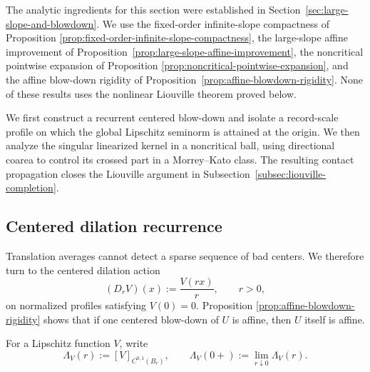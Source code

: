 \documentclass[11pt,reqno]{amsart}
\numberwithin{equation}{section}
\theoremstyle{remark}
\begin{document}
The analytic ingredients for this section were established in
Section~\ref{sec:large-slope-and-blowdown}.  We use the fixed-order
infinite-slope compactness of Proposition
\ref{prop:fixed-order-infinite-slope-compactness}, the large-slope affine
improvement of Proposition~\ref{prop:large-slope-affine-improvement}, the
noncritical pointwise expansion of Proposition
\ref{prop:noncritical-pointwise-expansion}, and the affine blow-down
rigidity of Proposition~\ref{prop:affine-blowdown-rigidity}.  None of
these results uses the nonlinear Liouville theorem proved below.

We first construct a recurrent centered blow-down and isolate a
record-scale profile on which the global Lipschitz seminorm is attained
at the origin.  We then analyze the singular linearized kernel in a
noncritical ball, using directional coarea to control its crossed part
in a Morrey--Kato class.  The resulting contact propagation closes the
Liouville argument in Subsection~\ref{subsec:liouville-completion}.

\subsection{Centered dilation recurrence}
\label{subsec:centered-dilation-recurrence}

Translation averages cannot detect a sparse sequence of bad centers.  We
therefore turn to the centered dilation action
\[
 (D_rV)(x):=\frac{V(rx)}r,
 \qquad r>0,
\]
on normalized profiles satisfying $V(0)=0$.  Proposition
\ref{prop:affine-blowdown-rigidity} shows that if one centered blow-down
of \(U\) is affine, then \(U\) itself is affine.

For a Lipschitz function $V$, write
\[
 \Lambda_V(r):=[V]_{C^{0,1}(B_r)},
 \qquad
 \Lambda_V(0+):=\lim_{r\downarrow0}\Lambda_V(r).
\]
\end{document}

